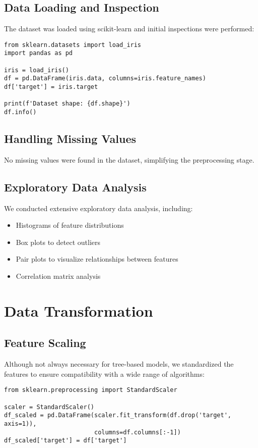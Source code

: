 \documentclass[12pt,a4paper]{article}
\begin{document}
\subsection{Data Loading and Inspection}
The dataset was loaded using scikit-learn and initial inspections were performed:

\begin{verbatim}
from sklearn.datasets import load_iris
import pandas as pd

iris = load_iris()
df = pd.DataFrame(iris.data, columns=iris.feature_names)
df['target'] = iris.target

print(f'Dataset shape: {df.shape}')
df.info()
\end{verbatim}

\subsection{Handling Missing Values}
No missing values were found in the dataset, simplifying the preprocessing stage.

\subsection{Exploratory Data Analysis}
We conducted extensive exploratory data analysis, including:
\begin{itemize}
    \item Histograms of feature distributions
    \item Box plots to detect outliers
    \item Pair plots to visualize relationships between features
    \item Correlation matrix analysis
\end{itemize}

\section{Data Transformation}
\subsection{Feature Scaling}
Although not always necessary for tree-based models, we standardized the features to ensure compatibility with a wide range of algorithms:

\begin{verbatim}
from sklearn.preprocessing import StandardScaler

scaler = StandardScaler()
df_scaled = pd.DataFrame(scaler.fit_transform(df.drop('target', axis=1)), 
                         columns=df.columns[:-1])
df_scaled['target'] = df['target']
\end{verbatim}
\end{document}
